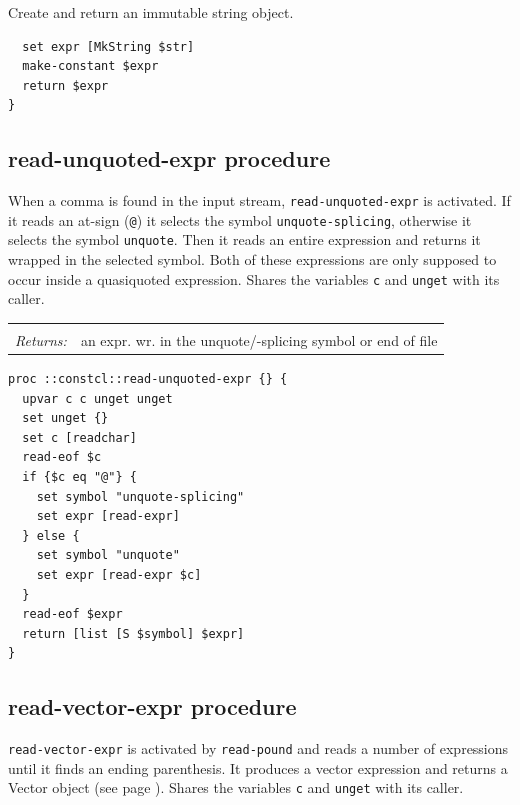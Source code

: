 \documentclass[twoside]{report}
\begin{document}
Create and return an immutable string object.

\begin{lstlisting}
  set expr [MkString $str]
  make-constant $expr
  return $expr
}
\end{lstlisting}

\subsection{read-unquoted-expr procedure}
\label{readunquotedexpr-procedure}

When a comma is found in the input stream, \texttt{read-unquoted-expr} is activated. If it reads an at-sign (\texttt{@}) it selects the symbol \texttt{unquote-splicing}, otherwise it selects the symbol \texttt{unquote}. Then it reads an entire expression and returns it wrapped in the selected symbol. Both of these expressions are only supposed to occur inside a quasiquoted expression. Shares the variables \texttt{c} and \texttt{unget} with its caller.

\noindent\begin{tabular}{ |p{1.9cm} p{8cm}| }
\hline
\rowcolor[HTML]{CCCCCC} \multicolumn{2}{|l|}{\bf read-unquoted-expr (internal)} \\
\textit{Returns:} & an expr. wr. in the unquote/-splicing symbol or end of file \\
\hline
\end{tabular}

\begin{lstlisting}
proc ::constcl::read-unquoted-expr {} {
  upvar c c unget unget
  set unget {}
  set c [readchar]
  read-eof $c
  if {$c eq "@"} {
    set symbol "unquote-splicing"
    set expr [read-expr]
  } else {
    set symbol "unquote"
    set expr [read-expr $c]
  }
  read-eof $expr
  return [list [S $symbol] $expr]
}
\end{lstlisting}

\subsection{read-vector-expr procedure}
\label{readvectorexpr-procedure}

\texttt{read-vector-expr} is activated by \texttt{read-pound} and reads a number of expressions until it finds an ending parenthesis. It produces a vector expression and returns a Vector object (see page \pageref{vectors}). Shares the variables \texttt{c} and \texttt{unget} with its caller.
\end{document}
